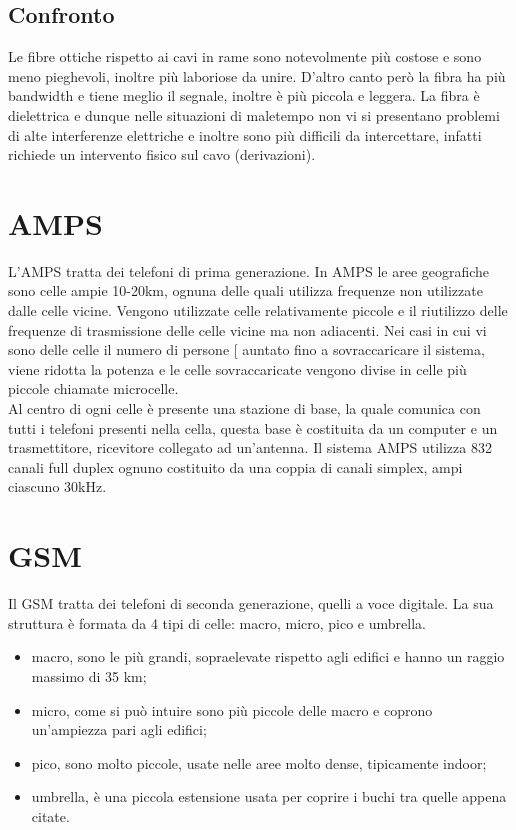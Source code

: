\documentclass{article}
\begin{document}
\subsection{Confronto}
Le fibre ottiche rispetto ai cavi in rame sono notevolmente più costose e sono
meno pieghevoli, inoltre più laboriose da unire. D'altro canto però la fibra ha
più bandwidth e tiene meglio il segnale, inoltre è più piccola e leggera. La
fibra è dielettrica e dunque nelle situazioni di maletempo non vi si presentano
problemi di alte interferenze elettriche e inoltre sono più difficili da
intercettare, infatti richiede un intervento fisico sul cavo (derivazioni).

\section{AMPS}

L'AMPS tratta dei telefoni di prima generazione. In AMPS le aree geografiche
sono celle ampie 10-20km, ognuna delle quali utilizza frequenze non utilizzate
dalle celle vicine. Vengono utilizzate celle relativamente piccole e il
riutilizzo delle frequenze di trasmissione delle celle vicine ma non adiacenti.
Nei casi in cui vi sono delle celle il numero di persone [ auntato fino a
sovraccaricare il sistema, viene ridotta la potenza e le celle sovraccaricate
vengono divise in celle più piccole chiamate microcelle.\\
Al centro di ogni celle è presente una stazione di base, la quale comunica con
tutti i telefoni presenti nella cella, questa base è costituita da un computer e
un trasmettitore, ricevitore collegato ad un'antenna. Il sistema AMPS utilizza
832 canali full duplex ognuno costituito da una coppia di canali simplex, ampi
ciascuno 30kHz.

\section{GSM}

Il GSM tratta dei telefoni di seconda generazione, quelli a voce digitale. La
sua struttura è formata da 4 tipi di celle: macro, micro, pico e umbrella.
\begin{itemize}
	\item macro, sono le più grandi, sopraelevate rispetto agli edifici e hanno
		un raggio massimo di 35 km;

	\item micro, come si può intuire sono più piccole delle macro e coprono
		un'ampiezza pari agli edifici;

	\item pico, sono molto piccole, usate nelle aree molto dense, tipicamente
		indoor;

	\item umbrella, è una piccola estensione usata per coprire i buchi tra
		quelle appena citate.
\end{itemize}
\end{document}
